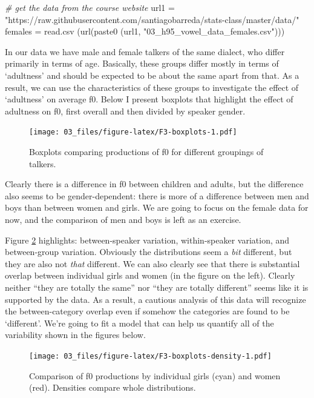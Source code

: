 \documentclass[
]{book}
\newenvironment{Shaded}{\begin{snugshade}}{\end{snugshade}}
\newcommand{\CommentTok}[1]{\textcolor[rgb]{0.56,0.35,0.01}{\textit{#1}}}
\newcommand{\FunctionTok}[1]{\textcolor[rgb]{0.00,0.00,0.00}{#1}}
\newcommand{\NormalTok}[1]{#1}
\newcommand{\OtherTok}[1]{\textcolor[rgb]{0.56,0.35,0.01}{#1}}
\newcommand{\StringTok}[1]{\textcolor[rgb]{0.31,0.60,0.02}{#1}}
\begin{document}
\begin{Shaded}
\begin{Highlighting}[]
\CommentTok{\# get the data from the course website}
\NormalTok{url1 }\OtherTok{=} \StringTok{"https://raw.githubusercontent.com/santiagobarreda/stats{-}class/master/data/"}
\NormalTok{females }\OtherTok{=} \FunctionTok{read.csv}\NormalTok{ (}\FunctionTok{url}\NormalTok{(}\FunctionTok{paste0}\NormalTok{ (url1, }\StringTok{"03\_h95\_vowel\_data\_females.csv"}\NormalTok{)))}
\end{Highlighting}
\end{Shaded}

In our data we have male and female talkers of the same dialect, who differ primarily in terms of age. Basically, these groups differ mostly in terms of `adultness' and should be expected to be about the same apart from that. As a result, we can use the characteristics of these groups to investigate the effect of `adultness' on average f0. Below I present boxplots that highlight the effect of adultness on f0, first overall and then divided by speaker gender.

\begin{figure}
\centering
\texttt{[image: 03\_files/figure-latex/F3-boxplots-1.pdf]}
\caption{\label{fig:F3-boxplots}Boxplots comparing productions of f0 for different groupings of talkers.}
\end{figure}

Clearly there is a difference in f0 between children and adults, but the difference also seems to be gender-dependent: there is more of a difference between men and boys than between women and girls. We are going to focus on the female data for now, and the comparison of men and boys is left as an exercise.

Figure \ref{fig:F3-boxplots-density} highlights: between-speaker variation, within-speaker variation, and between-group variation. Obviously the distributions seem a \emph{bit} different, but they are also not \emph{that} different. We can also clearly see that there is substantial overlap between individual girls and women (in the figure on the left). Clearly neither ``they are totally the same'' nor ``they are totally different'' seems like it is supported by the data. As a result, a cautious analysis of this data will recognize the between-category overlap even if somehow the categories are found to be `different'. We're going to fit a model that can help us quantify all of the variability shown in the figures below.

\begin{figure}
\centering
\texttt{[image: 03\_files/figure-latex/F3-boxplots-density-1.pdf]}
\caption{\label{fig:F3-boxplots-density}Comparison of f0 productions by individual girls (cyan) and women (red). Densities compare whole distributions.}
\end{figure}
\end{document}
